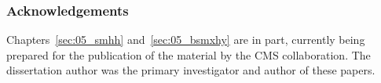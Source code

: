 

\subsubsection{Acknowledgements}

Chapters~\ref{sec:05_smhh} and~\ref{sec:05_bsmxhy} are in part, currently being prepared for the publication of the material by the CMS collaboration.
The dissertation author was the primary investigator and author of these papers.








